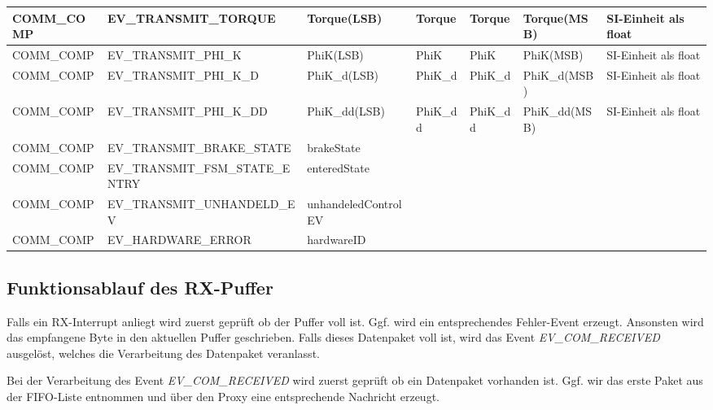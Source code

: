 \documentclass{article}
\begin{document}
\begin{landscape}
\begin{table}[]
\begin{tabular}{|l|l|l|l|l|l|l|}
COMM\_COMP     & EV\_TRANSMIT\_TORQUE            & Torque(LSB)         & Torque         & Torque         & Torque(MSB)    & SI-Einheit als float \\ \hline
COMM\_COMP     & EV\_TRANSMIT\_PHI\_K            & PhiK(LSB)           & PhiK           & PhiK           & PhiK(MSB)      & SI-Einheit als float \\ \hline
COMM\_COMP     & EV\_TRANSMIT\_PHI\_K\_D         & PhiK\_d(LSB)        & PhiK\_d        & PhiK\_d        & PhiK\_d(MSB)   & SI-Einheit als float \\ \hline
COMM\_COMP     & EV\_TRANSMIT\_PHI\_K\_DD        & PhiK\_dd(LSB)       & PhiK\_dd       & PhiK\_dd       & PhiK\_dd(MSB)  & SI-Einheit als float \\ \hline
COMM\_COMP     & EV\_TRANSMIT\_BRAKE\_STATE      & brakeState          &                &                &                &                      \\ \hline
COMM\_COMP     & EV\_TRANSMIT\_FSM\_STATE\_ENTRY & enteredState        &                &                &                &                      \\ \hline
COMM\_COMP     & EV\_TRANSMIT\_UNHANDELD\_EV     & unhandeledControlEV &                &                &                &                      \\ \hline
COMM\_COMP     & EV\_HARDWARE\_ERROR             & hardwareID          &                &                &                &                      \\ \hline
\end{tabular}
\end{table}

\end{landscape}

\newpage
\subsection*{Funktionsablauf des RX-Puffer}
Falls ein RX-Interrupt anliegt wird zuerst geprüft ob der Puffer voll ist. Ggf. wird ein entsprechendes Fehler-Event erzeugt. Ansonsten wird das empfangene Byte in den aktuellen Puffer geschrieben. Falls dieses Datenpaket voll ist, wird das Event \textit{EV\_COM\_RECEIVED} ausgelöst, welches die Verarbeitung des Datenpaket veranlasst.

Bei der Verarbeitung des Event \textit{EV\_COM\_RECEIVED}  wird zuerst geprüft ob ein Datenpaket vorhanden ist. Ggf. wir das erste Paket aus der FIFO-Liste entnommen und über den Proxy eine entsprechende Nachricht erzeugt.
\end{document}
